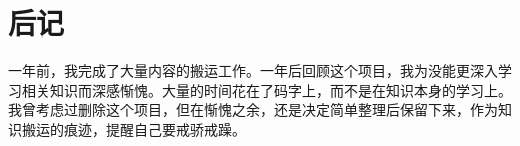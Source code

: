 \chapter{后记}

一年前，我完成了大量内容的搬运工作。一年后回顾这个项目，我为没能更深入学习相关知识而深感惭愧。大量的时间花在了码字上，而不是在知识本身的学习上。我曾考虑过删除这个项目，但在惭愧之余，还是决定简单整理后保留下来，作为知识搬运的痕迹，提醒自己要戒骄戒躁。
